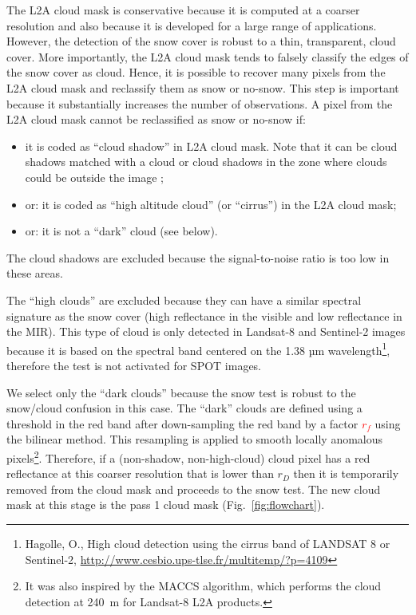 \documentclass[a4paper]{article}
\begin{document}
The L2A cloud mask is conservative because it is computed at a coarser resolution and also because it is developed for a large range of applications. However, the detection of the snow cover is robust to a thin, transparent, cloud cover. More importantly, the L2A cloud mask tends to falsely classify the edges of the snow cover as cloud. Hence, it is possible to recover many pixels from the L2A cloud mask and reclassify them as snow or no-snow. This step is important because it substantially increases the number of observations. A pixel from the L2A cloud mask cannot be reclassified as snow or no-snow if:

\begin{itemize}
 \item it is coded as ``cloud shadow''  in L2A cloud mask. Note that it can be
   cloud shadows matched with a cloud or cloud shadows in the zone where clouds could be outside the image ;
 \item or: it is coded as ``high altitude cloud'' (or ``cirrus'') in the L2A cloud mask;
 \item or: it is not a ``dark'' cloud (see below).
\end{itemize}

The cloud shadows are excluded because the signal-to-noise ratio is too low in these areas. 

The ``high clouds'' are excluded because they can have a similar spectral signature as the snow cover (high reflectance in the visible and low reflectance in the MIR). This type of cloud is only detected in Landsat-8 and Sentinel-2 images because it is based on the spectral band centered on the 1.38 µm wavelength\footnote{Hagolle, O., High cloud detection using the cirrus band of LANDSAT 8 or Sentinel-2, \url{http://www.cesbio.ups-tlse.fr/multitemp/?p=4109}}, therefore the test is not activated for SPOT images.

We select only the ``dark clouds'' because the snow test is robust to the snow/cloud confusion in this case. The ``dark'' clouds are defined using a threshold in the red band after down-sampling the red band by a factor \textcolor{red}{$r_f$} using the bilinear method. This resampling is applied to smooth locally anomalous pixels\footnote{It was also inspired by the MACCS algorithm, which performs the cloud detection at 240~m for Landsat-8 L2A products.}. Therefore, if a (non-shadow, non-high-cloud) cloud pixel has a red reflectance at this coarser resolution that is lower than $r_D$ then it is temporarily removed from the cloud mask and proceeds to the snow test. The new cloud mask at this stage is the pass 1 cloud mask (Fig.~\ref{fig:flowchart}). 
\end{document}

